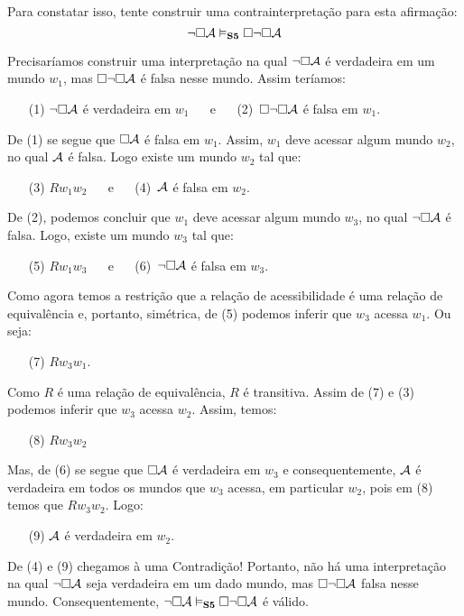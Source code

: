 Para constatar isso, tente construir uma contrainterpretação para esta afirmação:
\[
	\neg\Box\mathcal{A} \vDash_{\mathbf{S5}}  \Box \neg\Box \mathcal{A}
\]
 
 

Precisaríamos construir uma interpretação  na qual  $\neg\Box\mathcal{A}$ é verdadeira em um mundo $w_1$, mas  $\Box \neg\Box \mathcal{A}$  é falsa nesse mundo. Assim teríamos:

  \begin{itemize}
	\item[(1)]  $\neg\Box\mathcal{A}$ é verdadeira em $w_1$   \,\,\,\,\,\,  e \,\,\,\,\,\,  (2)\, $\Box \neg\Box \mathcal{A}$  é falsa em $w_1$.   
\end{itemize} 
De (1) se segue que $\Box\mathcal{A}$ é falsa em  $w_1$. Assim, $w_1$  deve acessar algum mundo $w_2$, no qual $\mathcal{A}$ é falsa. Logo existe um mundo $w_2$ tal que:
 \begin{itemize}
	\item[(3)]  $Rw_1w_2$      \,\,\,\,\,\,  e \,\,\,\,\,\,  (4)\, $\mathcal{A}$ é falsa em $w_2$.  
\end{itemize} 
De (2), podemos concluir que $w_1$ deve acessar algum mundo $w_3$, no qual $\neg\Box \mathcal{A}$ é falsa. Logo,  existe um mundo $w_3$ tal que:
 \begin{itemize}
	\item[(5)]  $Rw_1w_3$   \,\,\,\,\,\,  e \,\,\,\,\,\,  (6)\, $\neg\Box \mathcal{A}$ é falsa em $w_3$.  
\end{itemize} 
Como agora temos a restrição que a relação de acessibilidade é uma relação de equivalência e, portanto, simétrica,  de (5) podemos inferir que $w_3$ acessa  $w_1$. Ou seja:
\begin{itemize}
	\item[(7)]   $Rw_3w_1$. 
\end{itemize}
Como  $R$ é uma relação de equivalência,  $R$ é transitiva. Assim de (7) e (3) podemos inferir  que $w_3$ acessa $w_2$. Assim,   temos:
 \begin{itemize}
	\item[(8)]   $Rw_3w_2$     
\end{itemize} 
 Mas, de (6) se segue que $\Box \mathcal{A}$   é verdadeira em $w_3$ e consequentemente, $\mathcal{A}$ é verdadeira em todos os mundos que $w_3$ acessa, em particular $w_2$, pois em (8) temos que $Rw_3w_2$. Logo:
 \begin{itemize}
	\item[(9)]  $\mathcal{A}$ é verdadeira em $w_2$.        
\end{itemize} 
De (4)  e (9) chegamos à uma Contradição!
Portanto, não há uma interpretação  na qual $\neg\Box\mathcal{A}$ seja verdadeira em um dado mundo, mas  $\Box \neg\Box \mathcal{A}$  falsa nesse mundo. Consequentemente,  $\neg\Box \mathcal{A} \vDash_{\mathbf{S5}} \Box\neg\Box \mathcal{A}$ é válido. \\

